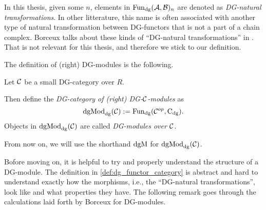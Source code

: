In this thesis, given some \( n \), elements in \( \operatorname{Fun}_{\operatorname{dg}}({\mathcal{A}}, {\mathcal{B}})_n \) are denoted as \emph{DG-natural transformations}. In other litterature, this name is often associated with another type of natural transformation between DG-functors that is not a part of a chain complex. Borceux talks about these kinds of ``DG-natural transformations'' in \cite[Definition 6.2.4]{Borceux_1994}. That is not relevant for this thesis, and therefore we stick to our definition.

The definition of (right) DG-modules is the following.

\begin{definition}
    Let \( {\mathcal{C}} \) be a small DG-category over \( R \).

    Then define the \emph{DG-category of (right) DG-\( {\mathcal{C}} \)-modules} as
    \[
        \operatorname{dgMod}_{\operatorname{dg}}({\mathcal{C}}) := \operatorname{Fun}_{\operatorname{dg}}({\mathcal{C}}^{op}, \operatorname{C}_{\operatorname{dg}}).
    \]
    Objects in \( \operatorname{dgMod}_{\operatorname{dg}}({\mathcal{C}}) \) are called \emph{DG-modules over \( {\mathcal{C}} \)}.

    From now on, we will use the shorthand \( \operatorname{dgM} \) for \( \operatorname{dgMod}_{\operatorname{dg}}({\mathcal{C}}) \).
\end{definition}

Bofore moving on, it is helpful to try and properly understand the structure of a DG-module. The definition in \autoref{def:dg_functor_category} is abstract and hard to understand exactly how the morphisms, i.e., the ``DG-natural transformations'', look like and what properties they have. The following remark goes through the calculations laid forth by Borceux for DG-modules.

